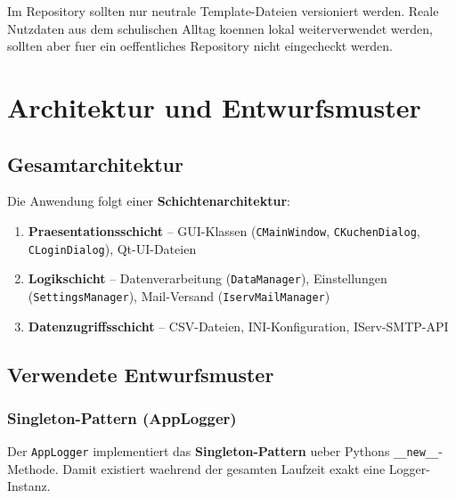 \documentclass[12pt, a4paper]{article}
\begin{document}
\begin{warnbox}
Im Repository sollten nur neutrale Template-Dateien versioniert werden. Reale
Nutzdaten aus dem schulischen Alltag koennen lokal weiterverwendet werden,
sollten aber fuer ein oeffentliches Repository nicht eingecheckt werden.
\end{warnbox}


\section{Architektur und Entwurfsmuster}

\subsection{Gesamtarchitektur}

Die Anwendung folgt einer \textbf{Schichtenarchitektur}:

\begin{tcolorbox}[
    colback=white, colframe=primary!50,
    boxrule=0.5pt, arc=3pt,
]
\begin{enumerate}[leftmargin=1.5em]
    \item \textbf{Praesentationsschicht} -- GUI-Klassen (\texttt{CMainWindow},
        \texttt{CKuchenDialog}, \texttt{CLoginDialog}), Qt-UI-Dateien
    \item \textbf{Logikschicht} -- Datenverarbeitung (\texttt{DataManager}),
        Einstellungen (\texttt{SettingsManager}), Mail-Versand
        (\texttt{IservMailManager})
    \item \textbf{Datenzugriffsschicht} -- CSV-Dateien, INI-Konfiguration,
        IServ-SMTP-API
\end{enumerate}
\end{tcolorbox}

\subsection{Verwendete Entwurfsmuster}

\subsubsection{Singleton-Pattern (AppLogger)}

Der \texttt{AppLogger} implementiert das \textbf{Singleton-Pattern} ueber Pythons
\texttt{\_\_new\_\_}-Methode. Damit existiert waehrend der gesamten Laufzeit
exakt eine Logger-Instanz.
\end{document}
